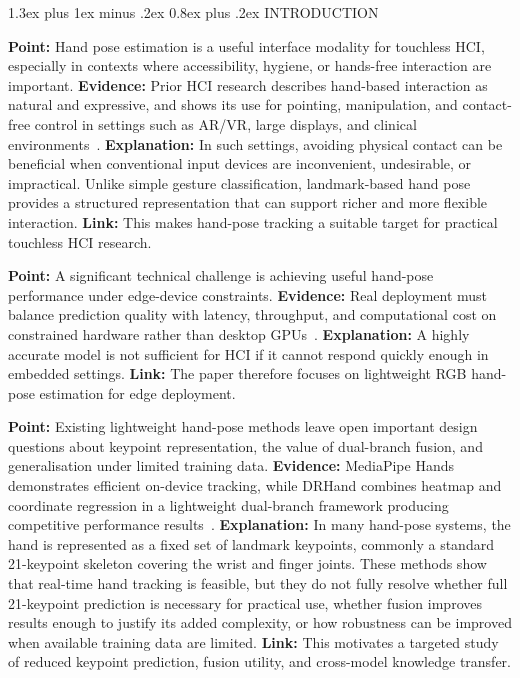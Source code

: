 \documentclass[10pt,letterpaper]{article}
\makeatletter
\renewcommand\section{\@startsection{section}{1}{\z@}%
  {1.3ex plus 1ex minus .2ex}%
  {0.8ex plus .2ex}%
  {\centering\normalfont\small\scshape}}
\makeatother
\begin{document}
\section{INTRODUCTION}

\medskip
\noindent\textbf{Point:} Hand pose estimation is a useful interface modality for touchless HCI, especially in contexts where accessibility, hygiene, or hands-free interaction are important.
\textbf{Evidence:} Prior HCI research describes hand-based interaction as natural and expressive, and shows its use for pointing, manipulation, and contact-free control in settings such as AR/VR, large displays, and clinical environments~\cite{vuletic,wachs,li_vr}.
\textbf{Explanation:} In such settings, avoiding physical contact can be beneficial when conventional input devices are inconvenient, undesirable, or impractical. Unlike simple gesture classification, landmark-based hand pose provides a structured representation that can support richer and more flexible interaction.
\textbf{Link:} This makes hand-pose tracking a suitable target for practical touchless HCI research.

\medskip
\noindent\textbf{Point:} A significant technical challenge is achieving useful hand-pose performance under edge-device constraints.
\textbf{Evidence:} Real deployment must balance prediction quality with latency, throughput, and computational cost on constrained hardware rather than desktop GPUs~\cite{attentionlite,srhandnet,dualreg}.
\textbf{Explanation:} A highly accurate model is not sufficient for HCI if it cannot respond quickly enough in embedded settings.
\textbf{Link:} The paper therefore focuses on lightweight RGB hand-pose estimation for edge deployment.

\medskip
\noindent\textbf{Point:} Existing lightweight hand-pose methods leave open important design questions about keypoint representation, the value of dual-branch fusion, and generalisation under limited training data.
\textbf{Evidence:} MediaPipe Hands demonstrates efficient on-device tracking, while DRHand combines heatmap and coordinate regression in a lightweight dual-branch framework producing competitive performance results~\cite{mediapipe,dualreg}.
\textbf{Explanation:} In many hand-pose systems, the hand is represented as a fixed set of landmark keypoints, commonly a standard 21-keypoint skeleton covering the wrist and finger joints. These methods show that real-time hand tracking is feasible, but they do not fully resolve whether full 21-keypoint prediction is necessary for practical use, whether fusion improves results enough to justify its added complexity, or how robustness can be improved when available training data are limited.
\textbf{Link:} This motivates a targeted study of reduced keypoint prediction, fusion utility, and cross-model knowledge transfer.
\end{document}
